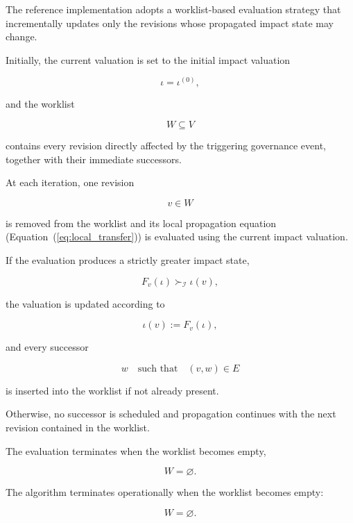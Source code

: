 \documentclass[10pt]{article}
\begin{document}
	The reference implementation adopts a worklist-based evaluation strategy that
	incrementally updates only the revisions whose propagated impact state may
	change.
	
	Initially, the current valuation is set to the initial impact valuation
	
	\[
	\iota
	=
	\iota^{(0)},
	\]
	
	and the worklist
	
	\[
	W
	\subseteq
	V
	\]
	
	contains every revision directly affected by the triggering governance event,
	together with their immediate successors.
	
	At each iteration, one revision
	
	\[
	v\in W
	\]
	
	is removed from the worklist and its local propagation equation
	(Equation~(\ref{eq:local_transfer})) is evaluated using the current impact
	valuation.
	
	If the evaluation produces a strictly greater impact state,
	
	\begin{equation}
		\label{eq:worklist_update}
		F_v(\iota)
		\succ_{\mathcal I}
		\iota(v),
	\end{equation}
	
	the valuation is updated according to
	
	\begin{equation}
		\label{eq:worklist_assignment}
		\iota(v)
		:=
		F_v(\iota),
	\end{equation}
	
	and every successor
	
	\[
	w
	\quad
	\text{such that}
	\quad
	(v,w)\in E
	\]
	
	is inserted into the worklist if not already present.
	
	Otherwise, no successor is scheduled and propagation continues with the next
	revision contained in the worklist.
	
	The evaluation terminates when the worklist becomes empty,
	
	\begin{equation}
		\label{eq:worklist_stop}
		W
		=
		\varnothing.
	\end{equation}
	
	The algorithm terminates operationally when the worklist becomes empty:
	
	\begin{equation}
		W
		=
		\varnothing.
		\label{eq:worklist_stop}
	\end{equation}
	
\end{document}
